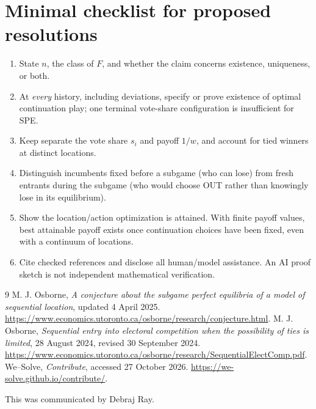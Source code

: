\documentclass[11pt]{article}
\begin{document}
\section{Minimal checklist for proposed resolutions}
\begin{enumerate}
\item State $n$, the class of $F$, and whether the claim concerns existence, uniqueness, or both.
\item At \emph{every} history, including deviations, specify or prove existence of optimal continuation play; one terminal vote-share configuration is insufficient for SPE.
\item Keep separate the vote share $s_i$ and payoff $1/w$, and account for tied winners at distinct locations.
\item Distinguish incumbents fixed before a subgame (who can lose) from fresh entrants during the subgame (who would choose OUT rather than knowingly lose in its equilibrium).
\item Show the location/action optimization is attained. With finite payoff values, best attainable payoff exists once continuation choices have been fixed, even with a continuum of locations.
\item Cite checked references and disclose all human/model assistance. An AI proof sketch is not independent mathematical verification.
\end{enumerate}

\begin{thebibliography}{9}
 M. J. Osborne, \emph{A conjecture about the subgame perfect equilibria of a model of sequential location}, updated 4 April 2025. \url{https://www.economics.utoronto.ca/osborne/research/conjecture.html}.
 M. J. Osborne, \emph{Sequential entry into electoral competition when the possibility of ties is limited}, 28 August 2024, revised 30 September 2024. \url{https://www.economics.utoronto.ca/osborne/research/SequentialElectComp.pdf}.
 We--Solve, \emph{Contribute}, accessed 27 October 2026. \url{https://we-solve.github.io/contribute/}.
\end{thebibliography}
\noindent This was communicated by Debraj Ray.
\end{document}

